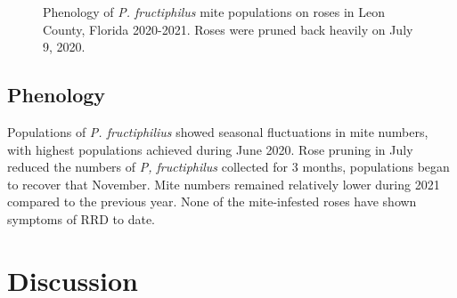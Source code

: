 \documentclass[12pt,final,CPage]{ufthesis}
\begin{document}
{\begin{figure}[h]
{  }

  \caption{Phenology of \textit{P. fructiphilus} mite populations on roses in Leon County, Florida 2020-2021. Roses were pruned back heavily on July 9, 2020.}\label{fig:pheno-graphs}
  \end{figure}
  \FloatBarrier

  \hypertarget{results-pheno}{%
  \subsection{Phenology}\label{results-pheno}}

  Populations of \emph{P. fructiphilius} showed seasonal fluctuations in mite numbers, with highest populations achieved during June 2020. Rose pruning in July reduced the numbers of \emph{P, fructiphilus} collected for 3 months, populations began to recover that November. Mite numbers remained relatively lower during 2021 compared to the previous year. None of the mite-infested roses have shown symptoms of RRD to date.

  \hypertarget{dis-survey-pheno}{%
  \section{Discussion}\label{dis-survey-pheno}}

}
\end{document}
